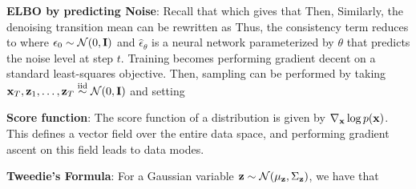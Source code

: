 \documentclass{article}
\begin{document}
  \textbf{ELBO by predicting Noise}: Recall that
  which gives that
  Then,
  Similarly, the denoising transition mean can be rewritten as
  Thus, the consistency term reduces to
  where $\epsilon_0\sim\mathcal{N}(0,\mathbf{I})$ and $\hat{\epsilon}_\theta$ is a neural network parameterized by $\theta$ that predicts the noise level at step $t$. Training becomes performing gradient decent on
  a standard least-squares objective. Then, sampling can be performed by taking $\mathbf{x}_T,\mathbf{z}_1,\dots,\mathbf{z}_T\overset{\text{iid}}{\sim}\mathcal{N}(0,\mathbf{I})$ and setting

  \textbf{Score function}: The score function of a distribution is given by $\nabla_{\mathbf{x}} \log p(\mathbf{x})$. This defines a vector field over the entire data space, and performing gradient ascent on this field leads to data modes.

  \textbf{Tweedie's Formula}: For a Gaussian variable $\mathbf{z}\sim\mathcal{N}(\mu_{\mathbf{z}},\Sigma_{\mathbf{z}})$, we have that
\end{document}
